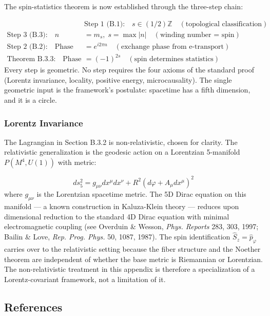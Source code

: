 \documentclass[aps,prd,preprint,superscriptaddress,longbibliography,floatfix]{revtex4-2}
\theoremstyle{remark}
\begin{document}
The spin-statistics theorem is now established through the three-step chain:


\begin{align}
    & \text{Step 1 (B.1):} \quad s \in (1/2)\mathbb{Z}               \quad (\text{topological classification}) \\
    \text{Step 3 (B.3):} \quad n &= m_s, \; s = \max|n|  \quad (\text{winding number = spin}) \\
    \text{Step 2 (B.2):} \quad \text{Phase} &= e^{i2\pi n}  \quad (\text{exchange phase from e-transport}) \\
    \text{Theorem B.3.3:} \quad \text{Phase} &= (-1)^{2s} \quad (\text{spin determines statistics})
\end{align}
Every step is geometric. No step requires the four axioms of the standard proof (Lorentz invariance, locality, positive energy, microcausality). The single geometric input is the framework's postulate: spacetime has a fifth dimension, and it is a circle.


\subsubsection{Lorentz Invariance}

The Lagrangian in Section B.3.2 is non-relativistic, chosen for clarity. The relativistic generalization is the geodesic action on a Lorentzian 5-manifold $P(M^{4}, U(1))$ with metric:


\begin{equation}
    ds_{5}^{2} = g_{\mu\nu} dx^\mu dx^\nu + R^{2} (d\varphi + A_\mu dx^\mu)^{2}
\end{equation}
where $g_{\mu\nu}$ is the Lorentzian spacetime metric. The 5D Dirac equation on this manifold --- a known construction in Kaluza-Klein theory --- reduces upon dimensional reduction to the standard 4D Dirac equation with minimal electromagnetic coupling (see Overduin \& Wesson, \textit{Phys. Reports} 283, 303, 1997; Bailin \& Love, \textit{Rep. Prog. Phys.} 50, 1087, 1987). The spin identification $\hat{S}_z = \hat{p}_\varphi$ carries over to the relativistic setting because the fiber structure and the Noether theorem are independent of whether the base metric is Riemannian or Lorentzian. The non-relativistic treatment in this appendix is therefore a specialization of a Lorentz-covariant framework, not a limitation of it.



\subsection{References}
\end{document}
